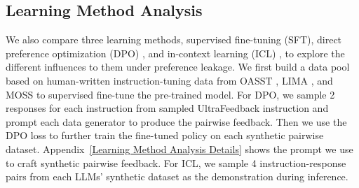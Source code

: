 \documentclass{article} %
\begin{document}
\subsection{Learning Method Analysis}
\label{Results under Different Learning Methods}


\begin{table}
\vspace{-22pt}
\caption{Preference leakage score in different learning methods.}
\vspace{5pt}
\centering
\small
{}
\label{tab:learning method}
\vspace{-10pt}
\end{table}


We also compare three learning methods, supervised fine-tuning (SFT), direct preference optimization (DPO) \cite{rafailov2024direct}, and in-context learning (ICL) \cite{dong2024survey}, to explore the different influences to them under preference leakage. We first build a data pool based on human-written instruction-tuning data from OASST \cite{kopf2024openassistant}, LIMA \cite{zhou2024lima}, and MOSS \cite{Sun2024MOSS} to supervised fine-tune the pre-trained model. For DPO, we sample 2 responses for each instruction from sampled UltraFeedback instruction and prompt each data generator to produce the pairwise feedback. Then we use the DPO loss to further train the fine-tuned policy on each synthetic pairwise dataset.  Appendix~\ref{Learning Method Analysis Details} shows the prompt we use to craft synthetic pairwise feedback. For ICL, we sample 4 instruction-response pairs from each LLMs' synthetic dataset as the demonstration during inference.
\end{document}
